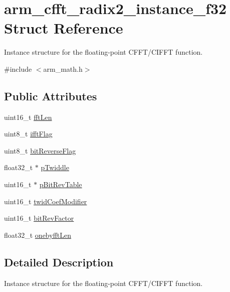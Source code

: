 \hypertarget{structarm__cfft__radix2__instance__f32}{\section{arm\-\_\-cfft\-\_\-radix2\-\_\-instance\-\_\-f32 Struct Reference}
\label{structarm__cfft__radix2__instance__f32}
}


Instance structure for the floating-\/point C\-F\-F\-T/\-C\-I\-F\-F\-T function.  




{\ttfamily \#include $<$arm\-\_\-math.\-h$>$}

\subsection*{Public Attributes}
\begin{DoxyCompactItemize}
\item 
uint16\-\_\-t \hyperlink{structarm__cfft__radix2__instance__f32_a2f915a1c29635c1623086aaaa726be8f}{fft\-Len}
\item 
uint8\-\_\-t \hyperlink{structarm__cfft__radix2__instance__f32_a8dbe98d2c924e35e0a3fed2fe948176f}{ifft\-Flag}
\item 
uint8\-\_\-t \hyperlink{structarm__cfft__radix2__instance__f32_af713b4ac5256a19bc965c89fe3005fa3}{bit\-Reverse\-Flag}
\item 
float32\-\_\-t $\ast$ \hyperlink{structarm__cfft__radix2__instance__f32_adb0c9d47dbfbd90a6f6ed0a05313a974}{p\-Twiddle}
\item 
uint16\-\_\-t $\ast$ \hyperlink{structarm__cfft__radix2__instance__f32_a92b8fa0a151cd800436094903a5ca0a4}{p\-Bit\-Rev\-Table}
\item 
uint16\-\_\-t \hyperlink{structarm__cfft__radix2__instance__f32_a411f75b6ed01690293f4f5988030ea42}{twid\-Coef\-Modifier}
\item 
uint16\-\_\-t \hyperlink{structarm__cfft__radix2__instance__f32_ac1688dafa5177f6b1505abbfd0cf8b21}{bit\-Rev\-Factor}
\item 
float32\-\_\-t \hyperlink{structarm__cfft__radix2__instance__f32_a1d3d289d47443e597d88a40effd14b8f}{onebyfft\-Len}
\end{DoxyCompactItemize}


\subsection{Detailed Description}
Instance structure for the floating-\/point C\-F\-F\-T/\-C\-I\-F\-F\-T function. 

